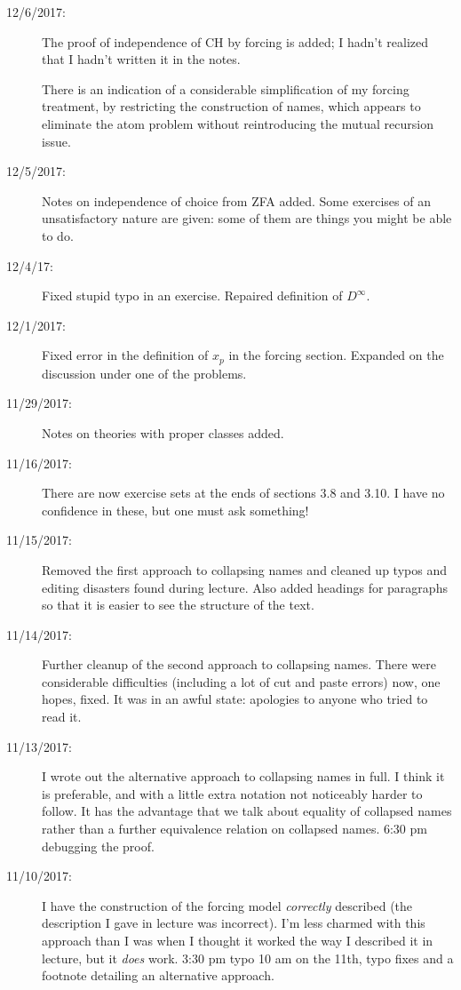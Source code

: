\documentclass[12pt]{book}
\begin{document}
{\begin{description}
\item[12/6/2017:]  The proof of independence of CH by forcing is added;  I hadn't realized that I hadn't written it in the notes.

There is an indication of a considerable simplification of my forcing treatment, by restricting the construction of names, which appears to eliminate the atom problem without reintroducing the mutual recursion issue.

\item[12/5/2017:]  Notes on independence of choice from ZFA added.  Some exercises of an unsatisfactory nature are given:  some of them are things you might be able to do.

\item[12/4/17:]  Fixed stupid typo in an exercise.  Repaired definition of $D^{\infty}$.

\item[12/1/2017:]  Fixed error in the definition of $x_p$ in the forcing section.  Expanded on the discussion under one of the problems.

\item[11/29/2017:]  Notes on theories with proper classes added.

\item[11/16/2017:]  There are now exercise sets at the ends of sections 3.8 and 3.10.  I have no confidence in these, but one must ask something!

\item[11/15/2017:]  Removed the first approach to collapsing names and cleaned up typos and editing disasters found during lecture.   Also added headings for paragraphs so that it is easier to see the structure of the text.

\item[11/14/2017:]  Further cleanup of the second approach to collapsing names.  There were considerable difficulties (including a lot of cut and paste errors) now, one hopes, fixed.  It was in an awful state:  apologies to anyone who tried to read it.

\item[11/13/2017:]  I wrote out the alternative approach to collapsing names in full.  I think it is preferable, and with a little extra notation not noticeably harder to follow.  It has the advantage that we talk about equality of collapsed names rather than a further equivalence relation on collapsed names.  6:30 pm debugging the  proof.

\item[11/10/2017:]  I have the construction of the forcing model {\em correctly\/} described (the description I gave in lecture was incorrect).  I'm less charmed with this approach than I was when I thought it worked the way I described it in lecture, but it {\em does\/} work.  3:30 pm typo  10 am on the 11th, typo fixes and a footnote detailing an alternative approach.


\end{description}}
\end{document}
